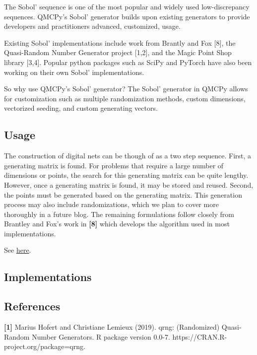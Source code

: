 The Sobol' sequence is one of the most popular and widely used low-discrepancy sequences. QMCPy's Sobol' generator builds upon existing generators to provide developers and practitioners advanced, customized, usage.

Existing Sobol' implementations include work from  Brantly and Fox [8], the Quasi-Random Number Generator project [1,2], and the Magic Point Shop library [3,4]. Popular python packages such as SciPy and PyTorch have also been working on their own Sobol' implementations. 

So why use QMCPy's Sobol' generator? The Sobol' generator in QMCPy allows for customization such as multiple randomization methods, custom dimensions, vectorized seeding, and custom generating vectors. 

\subsection{Usage}

The construction of digital nets can be though of as a two step sequence. First, a generating matrix is found. For problems that require a large number of dimensions or points, the search for this generating matrix can be quite lengthy. However, once a generating matrix is found, it may be stored and reused. Second, the points must be generated based on the generating matrix. This generation process may also include randomizations, which we plan to cover more thoroughly in a future blog. The remaining formulations follow closely from Brantley and Fox's work in \textbf{[8]} which develops the algorithm used in most implementations. 

See \href{http://umontreal-simul.github.io/latnetbuilder/dc/d5a/feats_pointsets.html#feats_pointsets_net_def}{here}.


\subsection{Implementations}

\subsection{References}


\noindent \textbf{[1]} Marius Hofert and Christiane Lemieux (2019). qrng: (Randomized) Quasi-Random Number Generators. R package version 0.0-7. https://CRAN.R-project.org/package=qrng.

